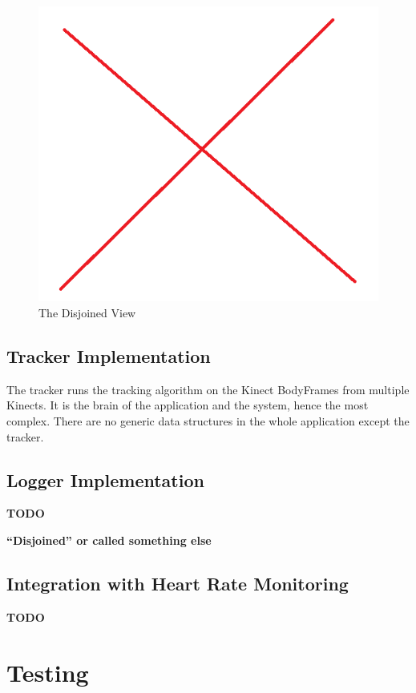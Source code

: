 \documentclass{sigchi}
\begin{document}
\begin{figure}[!h]
  \centering
  \includegraphics[width=0.9\columnwidth]{disjoined_view}
  \caption{The Disjoined View}
  \label{fig:disjoined_view}
\end{figure}

\subsection{Tracker Implementation}

The tracker runs the tracking algorithm on the Kinect BodyFrames from multiple Kinects. It is the brain of the application and the system, hence the most complex. There are no generic data structures in the whole application except the tracker. 

\subsection{Logger Implementation}

\textbf{TODO}

\textbf{``Disjoined'' or called something else}

\subsection{Integration with Heart Rate Monitoring}

\textbf{TODO}

\section{Testing}
\label{sec:testing}
\end{document}
